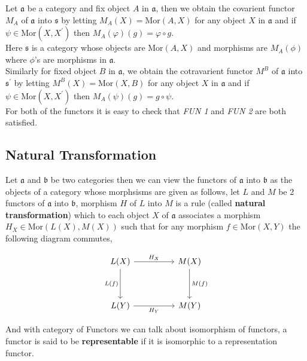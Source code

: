 \documentclass[11pt,a4paper]{colorart}
\def\mab{\mathfrak}
\def\oo{\circ}
\begin{document}
\begin{example}
	Let $\mab{a}$ be a category and fix object $A$ in $\mab{a}$, then we obtain the covarient functor $M_A$ of $\mab{a}$ into $\mab{s}$ by letting $M_A(X) = \text{Mor}(A,X)$ for any object $X$ in $\mab{a}$ and if $\psi \in \text{Mor}(X,X^\prime)$ then $M_A(\varphi)(g) = \varphi \oo g$.\\
	Here $\mab{s}$ is a category whose objects are Mor$(A,X)$ and morphisms are $M_A(\phi)$ where $\phi$'s are morphisms in $\mab{a}$.\\
	Similarly for fixed object $B$ in $\mab{a}$, we obtain the cotravarient functor $M^B$ of $\mab{a}$ into $\mab{s^\prime}$ by letting $M^B(X) = \text{Mor}(X,B)$ for any object $X$ in $\mab{a}$ and if $\psi \in \text{Mor}(X,X^\prime)$ then $M_A(\psi)(g) = g \oo \psi$.\\
	For both of the functors it is easy to check that \textit{FUN 1} and \textit{FUN 2} are both satisfied.
\end{example}

\subsection{Natural Transformation}

Let $\mab{a}$ and $\mab{b}$ be two categories then we can view the functors of $\mab{a}$ into $\mab{b}$ as the objects of a category whose morphsisms are given as follows, let $L$ and $M$ be 2 functors of $\mab{a}$ into $\mab{b}$, morphism $H$ of $L$ into $M$ is a rule (called \textbf{natural transformation}) which to each object $X$ of $\mab{a}$ associates a morphism $H_X\in \text{Mor}(L(X),M(X))$ such that for any morphism $f \in \text{Mor}(X,Y)$ the following diagram commutes,

\[\begin{tikzcd}
	{L(X)} && {M(X)} \\
	\\
	{L(Y)} && {M(Y)}
	\arrow["{L(f)}"', from=1-1, to=3-1]
	\arrow["{H_X}", from=1-1, to=1-3]
	\arrow["{M(f)}", from=1-3, to=3-3]
	\arrow["{H_Y}"', from=3-1, to=3-3]
\end{tikzcd}\]

And with category of Functors we can talk about isomorphism of functors, a functor is said to be \textbf{representable} if it is isomorphic to a representation functor.
\end{document}
